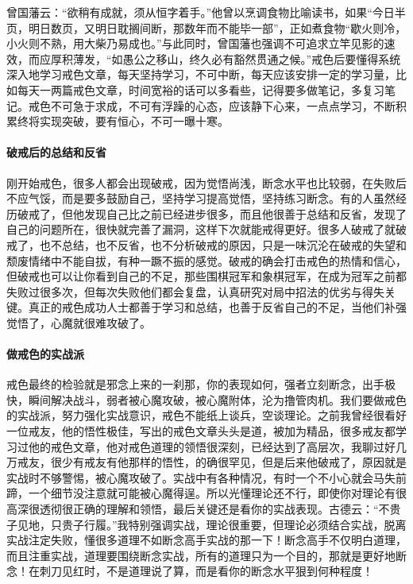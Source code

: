曾国藩云：“欲稍有成就，须从恒字着手。”他曾以烹调食物比喻读书，如果“今日半页，明日数页，又明日耽搁间断，那数年而不能毕一部”，正如煮食物“歇火则冷，小火则不熟，用大柴乃易成也。”与此同时，曾国藩也强调不可追求立竿见影的速效，而应厚积薄发，“如愚公之移山，终久必有豁然贯通之候。”戒色后要懂得系统深入地学习戒色文章，每天坚持学习，不可中断，每天应该安排一定的学习量，比如每天一两篇戒色文章，时间宽裕的话可以多看些，记得要多做笔记，多复习笔记。戒色不可急于求成，不可有浮躁的心态，应该静下心来，一点点学习，不断积累终将实现突破，要有恒心，不可一曝十寒。

\paragraph{破戒后的总结和反省}

刚开始戒色，很多人都会出现破戒，因为觉悟尚浅，断念水平也比较弱，在失败后不应气馁，而是要多鼓励自己，坚持学习提高觉悟，坚持练习断念。有的人虽然经历破戒了，但他发现自己比之前已经进步很多，而且他很善于总结和反省，发现了自己的问题所在，很快就完善了漏洞，这样下次就能戒得更好。很多人破戒了就破戒了，也不总结，也不反省，也不分析破戒的原因，只是一味沉沦在破戒的失望和颓废情绪中不能自拔，有种一蹶不振的感觉。破戒的确会打击戒色的热情和信心，但破戒也可以让你看到自己的不足，那些围棋冠军和象棋冠军，在成为冠军之前都失败过很多次，但每次失败他们都会复盘，认真研究对局中招法的优劣与得失关键。真正的戒色成功人士都善于学习和总结，也善于反省自己的不足，当他们补强觉悟了，心魔就很难攻破了。

\paragraph{做戒色的实战派}

戒色最终的检验就是邪念上来的一刹那，你的表现如何，强者立刻断念，出手极快，瞬间解决战斗，弱者被心魔攻破，被心魔附体，沦为撸管肉机。我们要做戒色的实战派，努力强化实战意识，戒色不能纸上谈兵，空谈理论。之前我曾经很看好一位戒友，他的悟性极佳，写出的戒色文章头头是道，被加为精品，很多戒友都学习过他的戒色文章，他对戒色道理的领悟很深刻，已经达到了高层次，我聊过好几万戒友，很少有戒友有他那样的悟性，的确很罕见，但是后来他破戒了，原因就是实战时不够警惕，被心魔攻破了。实战中有各种情况，有时一个不小心就会马失前蹄，一个细节没注意就可能被心魔得逞。所以光懂理论还不行，即使你对理论有很高深很透彻很正确的理解和领悟，最后关键还是看你的实战表现。古德云：“不贵子见地，只贵子行履。”我特别强调实战，理论很重要，但理论必须结合实战，脱离实战注定失败，懂很多道理不如断念高手实战的那一下！断念高手不仅明白道理，而且注重实战，道理要围绕断念实战，所有的道理只为一个目的，那就是更好地断念！在刺刀见红时，不是道理说了算，而是看你的断念水平狠到何种程度！

